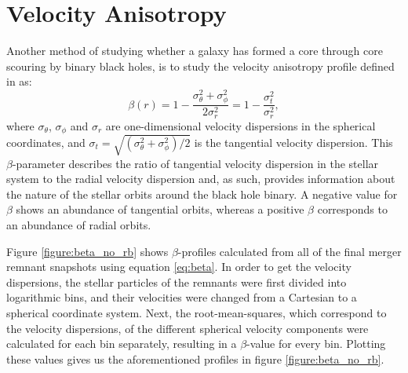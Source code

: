 \documentclass[english, twoside]{HYgradu}
\begin{document}
\section{Velocity Anisotropy}


Another method of studying whether a galaxy has formed a core through core scouring by binary black holes, is to study the velocity anisotropy profile defined in \cite{BinneyTremaine} as:
\begin{equation}
\beta(r) = 1 - \frac{\sigma_\theta^2 + \sigma_\phi^2}{2\sigma_r^2} = 1 - \frac{\sigma_t^2}{\sigma_r^2}, \label{eq:beta}
\end{equation}
where $\sigma_\theta$, $\sigma_\phi$ and $\sigma_r$ are one-dimensional velocity dispersions in the spherical coordinates, and $\sigma_t = \sqrt{(\sigma_\theta^2 + \sigma_\phi^2) / 2}$ is the tangential velocity dispersion. This $\beta$-parameter describes the ratio of tangential velocity dispersion in the stellar system to the radial velocity dispersion and, as such, provides information about the nature of the stellar orbits around the black hole binary. A negative value for $\beta$ shows an abundance of tangential orbits, whereas a positive $\beta$ corresponds to an abundance of radial orbits. 

Figure \ref{figure:beta_no_rb} shows $\beta$-profiles calculated from all of the final merger remnant snapshots using equation \ref{eq:beta}. In order to get the velocity dispersions, the stellar particles of the remnants were first divided into logarithmic bins, and their velocities were changed from a Cartesian to a spherical coordinate system. Next, the root-mean-squares, which correspond to the velocity dispersions, of the different spherical velocity components were calculated for each bin separately, resulting in a $\beta$-value for every bin. Plotting these values gives us the aforementioned profiles in figure \ref{figure:beta_no_rb}. 
\end{document}

